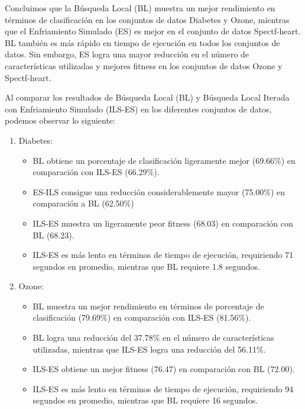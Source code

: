 \begin{enumerate}
Concluimos que la Búsqueda Local (BL) muestra un mejor rendimiento en términos de clasificación en los conjuntos de datos Diabetes y Ozone, mientras que el Enfriamiento Simulado (ES) es mejor en el conjunto de datos Spectf-heart. BL también es más rápido en tiempo de ejecución en todos los conjuntos de datos. Sin embargo, ES logra una mayor reducción en el número de características utilizadas y mejores fitness en los conjuntos de datos Ozone y Spectf-heart.

\end{enumerate}


Al comparar los resultados de Búsqueda Local (BL) y Búsqueda Local Iterada con Enfriamiento Simulado (ILS-ES) en los diferentes conjuntos de datos, podemos observar lo siguiente:

\begin{enumerate}

\item Diabetes:

\begin{itemize}
\item BL obtiene un porcentaje de clasificación ligeramente mejor (69.66\%) en comparación con ILS-ES (66.29\%).
\item ES-ILS consigue una reducción considerablemente mayor (75.00\%) en comparación a BL (62.50\%)
\item ILS-ES muestra un ligeramente peor fitness (68.03) en comparación con BL (68.23).
\item ILS-ES es más lento en términos de tiempo de ejecución, requiriendo 71 segundos en promedio, mientras que BL requiere 1.8 segundos.
\end{itemize}

\item Ozone:

\begin{itemize}
\item BL muestra un mejor rendimiento en términos de porcentaje de clasificación (79.69\%) en comparación con ILS-ES (81.56\%).
\item BL logra una reducción del 37.78\% en el número de características utilizadas, mientras que ILS-ES logra una reducción del 56.11\%.
\item ILS-ES obtiene un mejor fitness (76.47) en comparación con BL (72.00).
\item ILS-ES es más lento en términos de tiempo de ejecución, requiriendo 94 segundos en promedio, mientras que BL requiere 16 segundos.
\end{itemize}




\end{enumerate}
